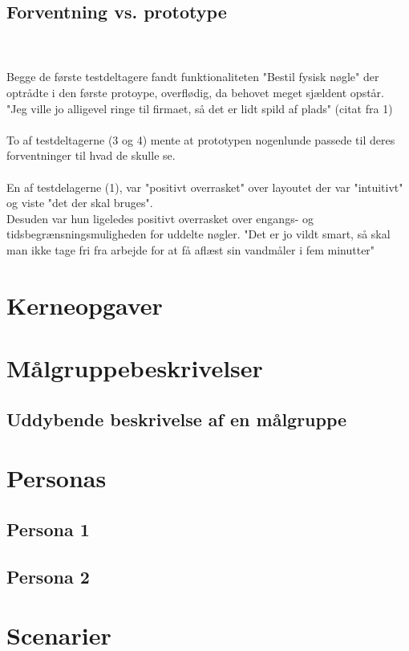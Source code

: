 \documentclass[a4paper,12pt]{article}
\begin{document}
\subsection{Forventning vs. prototype}
\\ \\
Begge de første testdeltagere fandt funktionaliteten "Bestil fysisk nøgle" der optrådte i den første protoype, overflødig, da behovet meget sjældent opstår. \\"Jeg ville jo alligevel ringe til firmaet, så det er lidt spild af plads" (citat fra 1)
\\ \\
To af testdeltagerne (3 og 4) mente at prototypen nogenlunde passede til deres forventninger til hvad de skulle se.
\\ \\
En af testdelagerne (1), var "positivt overrasket" over layoutet der var "intuitivt" og viste "det der skal bruges". \\ 
Desuden var hun ligeledes positivt overrasket over engangs- og tidsbegrænsningsmuligheden for uddelte nøgler. "Det er jo vildt smart, så skal man ikke tage fri fra arbejde for at få aflæst sin vandmåler i fem minutter"


\section{Kerneopgaver}

\section{Målgruppebeskrivelser}
\subsection{Uddybende beskrivelse af en målgruppe}

\section{Personas}
\subsection{Persona 1}
\subsection{Persona 2}

\section{Scenarier}
\end{document}
